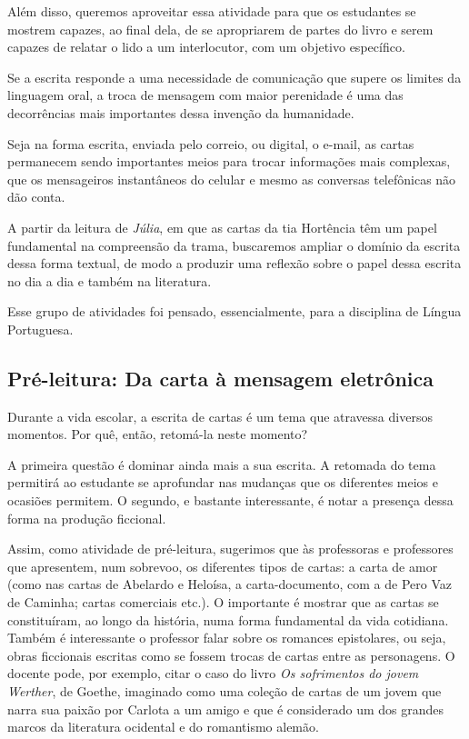 \documentclass[12pt]{extarticle}
\begin{document}
Além disso, queremos aproveitar essa atividade para que os estudantes se
mostrem capazes, ao final dela, de se apropriarem de partes do livro e
serem capazes de relatar o lido a um interlocutor, com um objetivo
específico.

Se a escrita responde a uma necessidade de comunicação que supere os
limites da linguagem oral, a troca de mensagem com maior perenidade é
uma das decorrências mais importantes dessa invenção da humanidade.

Seja na forma escrita, enviada pelo correio, ou digital, o e-mail, as
cartas permanecem sendo importantes meios para trocar informações mais
complexas, que os mensageiros instantâneos do celular e mesmo as
conversas telefônicas não dão conta.

A partir da leitura de \emph{Júlia}, em que as cartas da tia Hortência
têm um papel fundamental na compreensão da trama, buscaremos ampliar o
domínio da escrita dessa forma textual, de modo a produzir uma reflexão
sobre o papel dessa escrita no dia a dia e também na literatura.

Esse grupo de atividades foi pensado, essencialmente, para a disciplina
de Língua Portuguesa.


\subsection{Pré-leitura: Da carta à mensagem eletrônica}

Durante a vida escolar, a escrita de cartas é um tema que atravessa
diversos momentos. Por quê, então, retomá-la neste momento?

A primeira questão é dominar ainda mais a sua escrita. A retomada do
tema permitirá ao estudante se aprofundar nas mudanças que os diferentes
meios e ocasiões permitem. O segundo, e bastante interessante, é notar a
presença dessa forma na produção ficcional.

Assim, como atividade de pré-leitura, sugerimos que às professoras e
professores que apresentem, num sobrevoo, os diferentes tipos de cartas:
a carta de amor (como nas cartas de Abelardo e Heloísa, a
carta-documento, com a de Pero Vaz de Caminha; cartas comerciais etc.).
O importante é mostrar que as cartas se constituíram, ao longo da
história, numa forma fundamental da vida cotidiana. Também é
interessante o professor falar sobre os romances epistolares, ou seja,
obras ficcionais escritas como se fossem trocas de cartas entre as
personagens. O docente pode, por exemplo, citar o caso do livro \emph{Os
sofrimentos do jovem Werther}, de Goethe, imaginado como uma coleção de
cartas de um jovem que narra sua paixão por Carlota a um amigo e que é
considerado um dos grandes marcos da literatura ocidental e do
romantismo alemão.
\end{document}
